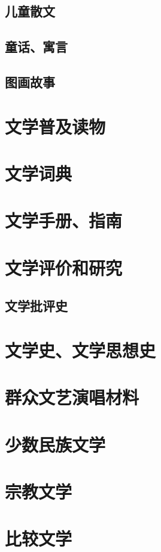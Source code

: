 \documentclass[UTF8]{../../RepresentationUniverse}
\begin{document}
    \subsection{儿童散文}
    \subsection{童话、寓言}
    \subsection{图画故事}



\section{文学普及读物}
\section{文学词典}
\section{文学手册、指南}

\section{文学评价和研究}
    \subsection{文学批评史}

\section{文学史、文学思想史}

\section{群众文艺演唱材料}

\section{少数民族文学}
\section{宗教文学}

\section{比较文学}
\end{document}
